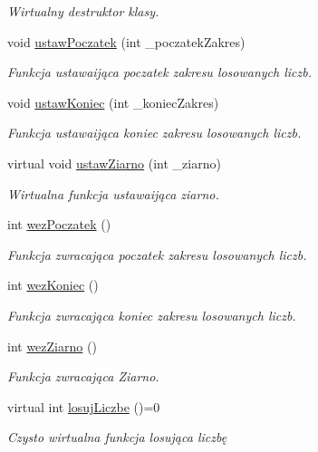 \begin{DoxyCompactItemize}
\begin{DoxyCompactList}\small\item\em \-Wirtualny destruktor klasy. \end{DoxyCompactList}\item 
void \hyperlink{classaghGenerator_a50c965afc1256e0ccb081139b28d546c}{ustaw\-Poczatek} (int \-\_\-poczatek\-Zakres)
\begin{DoxyCompactList}\small\item\em \-Funkcja ustawaijąca poczatek zakresu losowanych liczb. \end{DoxyCompactList}\item 
void \hyperlink{classaghGenerator_ad6417d51d8ff880270cc056efcd6f00c}{ustaw\-Koniec} (int \-\_\-koniec\-Zakres)
\begin{DoxyCompactList}\small\item\em \-Funkcja ustawaijąca koniec zakresu losowanych liczb. \end{DoxyCompactList}\item 
virtual void \hyperlink{classaghGenerator_aeb8309c8c8d14bb1df9a594776399a23}{ustaw\-Ziarno} (int \-\_\-ziarno)
\begin{DoxyCompactList}\small\item\em \-Wirtualna funkcja ustawaijąca ziarno. \end{DoxyCompactList}\item 
int \hyperlink{classaghGenerator_a4c07b2301d4f71f8b2956e9fc79cd3df}{wez\-Poczatek} ()
\begin{DoxyCompactList}\small\item\em \-Funkcja zwracająca poczatek zakresu losowanych liczb. \end{DoxyCompactList}\item 
int \hyperlink{classaghGenerator_aa418dbf03ba3f46b914258eaf5b23b7a}{wez\-Koniec} ()
\begin{DoxyCompactList}\small\item\em \-Funkcja zwracająca koniec zakresu losowanych liczb. \end{DoxyCompactList}\item 
int \hyperlink{classaghGenerator_abaa15dfd5d547a6d64b63153bd2ea765}{wez\-Ziarno} ()
\begin{DoxyCompactList}\small\item\em \-Funkcja zwracająca \-Ziarno. \end{DoxyCompactList}\item 
virtual int \hyperlink{classaghGenerator_ae0f3bbfe8a7d233c006728c060a2e453}{losuj\-Liczbe} ()=0
\begin{DoxyCompactList}\small\item\em \-Czysto wirtualna funkcja losująca liczbę \end{DoxyCompactList}\item 

\end{DoxyCompactItemize}
